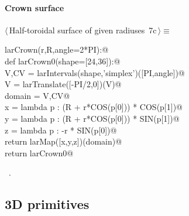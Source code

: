 \documentclass[11pt,oneside]{article}	%
\begin{document}
\paragraph{Crown surface}
\begin{flushleft} \small \label{scrap13}
\protect{}$\langle\,$Half-toroidal surface of given radiuses\nobreak\ {\footnotesize 7c}$\,\rangle\equiv$
\vspace{-1ex}
\begin{list}{}{} \item
\mbox{}\verb@def larCrown(r,R,angle=2*PI):@\\
\mbox{}\verb@   def larCrown0(shape=[24,36]):@\\
\mbox{}\verb@      V,CV = larIntervals(shape,'simplex')([PI,angle])@\\
\mbox{}\verb@      V = larTranslate([-PI/2,0])(V)@\\
\mbox{}\verb@      domain = V,CV@\\
\mbox{}\verb@      x = lambda p : (R + r*COS(p[0])) * COS(p[1])@\\
\mbox{}\verb@      y = lambda p : (R + r*COS(p[0])) * SIN(p[1])@\\
\mbox{}\verb@      z = lambda p : -r * SIN(p[0])@\\
\mbox{}\verb@      return larMap([x,y,z])(domain)@\\
\mbox{}\verb@   return larCrown0@\\
\mbox{}\verb@@{\NWsep}
\end{list}
\vspace{-1ex}
\footnotesize\addtolength{\baselineskip}{-1ex}
\begin{list}{}{\setlength{\itemsep}{-\parsep}\setlength{\itemindent}{-\leftmargin}}
\item \NWtxtMacroRefIn\ .
\end{list}
\end{flushleft}

\subsection{3D primitives}
\end{document}
